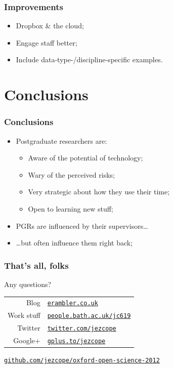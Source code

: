 \documentclass{beamer}
\newcommand{\shorturl}[2]%
  [?utm\_source=jsc\&utm\_medium=presentation\&utm\_campaign=ox\_open\_sci\_2012]%
  {\href{http://#2#1}{\nolinkurl{#2}}}
\begin{document}
\begin{frame}
  \frametitle{Improvements}
  
  \begin{itemize}
    \item Dropbox \& the cloud;
    \item Engage staff better;
    \item Include data-type-/discipline-specific examples.
  \end{itemize}
\end{frame}

\section{Conclusions}

\begin{frame}
  \frametitle{Conclusions}
  
  \begin{itemize}
    \item Postgraduate researchers are:
      \begin{itemize}
        \item Aware of the potential of technology;
        \item Wary of the perceived risks;
        \item Very strategic about how they use their time;
        \item \alert<2->{Open to learning new stuff;}
      \end{itemize}
    \item PGRs are influenced by their supervisors\ldots
    \item \ldots but often influence them right back;
  \end{itemize}
\end{frame}
\begin{frame}
  \frametitle{That's all, folks}

  \begin{center}
    \huge Any questions?

    \pause\small\bigskip\bigskip
    \begin{tabular}{rl}
      \toprule
      Blog        & \shorturl{erambler.co.uk} \\
      Work stuff  & \shorturl{people.bath.ac.uk/jc619} \\
      Twitter     & \shorturl[]{twitter.com/jezcope} \\
      Google+     & \shorturl[]{gplus.to/jezcope} \\
      \bottomrule
    \end{tabular}

    \bigskip
    \small\shorturl[]{github.com/jezcope/oxford-open-science-2012}\\
    \bigskip
    \href{http://creativecommons.org/licenses/by-sa/3.0/}{\ccbysa}
  \end{center}
\end{frame}
\end{document}
